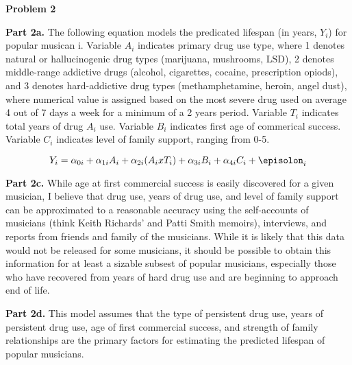 \documentclass[letterpaper,12pt]{article}
\theoremstyle{definition}
\begin{document}
\noindent\newline\textbf{Problem 2}

\noindent\textbf{Part 2a.} The following equation models the predicated lifespan (in years, \(Y_i\)) for popular musican i. Variable \(A_i\) indicates primary drug use type, where 1 denotes natural or hallucinogenic drug types (marijuana, mushrooms, LSD), 2 denotes middle-range addictive drugs (alcohol, cigarettes, cocaine, prescription opiods), and 3 denotes hard-addictive drug types (methamphetamine, heroin, angel dust), where numerical value is assigned based on the most severe drug used on average 4 out of 7 days a week for a minimum of a 2 years period. Variable \(T_i\) indicates total years of drug \(A_i\) use. Variable \(B_i\) indicates first age of commerical success. Variable \(C_i\) indicates level of family support, ranging from 0-5.

\begin{equation}
Y_i = \alpha_{0i} + \alpha_{1i}A_i +\alpha_{2i}(A_i x T_i) + \alpha_{3i}B_i + \alpha_{4i}C_i + \episolon_i
\end{equation}

\noindent\newline\textbf{Part 2c.} While age at first commercial success is easily discovered for a given musician, I believe that drug use, years of drug use, and level of family support can be approximated to a reasonable accuracy using the self-accounts of musicians (think Keith Richards' and Patti Smith memoirs), interviews, and reports from friends and family of the musicians. While it is likely that this data would not be released for some musicians, it should be possible to obtain this information for at least a sizable subsest of popular musicians, especially those who have recovered from years of hard drug use and are beginning to approach end of life.

\noindent\newline\textbf{Part 2d.} This model assumes that the type of persistent drug use, years of persistent drug use, age of first commercial success, and strength of family relationships are the primary factors for estimating the predicted lifespan of popular musicians.
\end{document}
